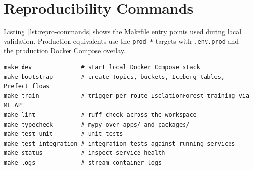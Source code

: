 \begin{table}[htbp]
\centering
\caption{Serving API endpoints used by the evaluation workflow.}
\label{tab:appendix-api}
\end{table}

\section{Reproducibility Commands}

Listing~\ref{lst:repro-commands} shows the Makefile entry points used during
local validation. Production equivalents use the \texttt{prod-*} targets with
\texttt{.env.prod} and the production Docker Compose overlay.

\begin{lstlisting}[caption={Local reproducibility commands.}, label={lst:repro-commands}]
make dev              # start local Docker Compose stack
make bootstrap        # create topics, buckets, Iceberg tables, Prefect flows
make train            # trigger per-route IsolationForest training via ML API
make lint             # ruff check across the workspace
make typecheck        # mypy over apps/ and packages/
make test-unit        # unit tests
make test-integration # integration tests against running services
make status           # inspect service health
make logs             # stream container logs
\end{lstlisting}

